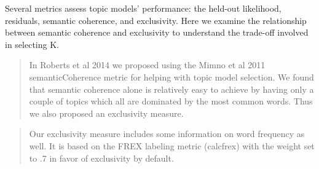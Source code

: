 \documentclass[
]{book}
\newenvironment{Shaded}{\begin{snugshade}}{\end{snugshade}}
\newcommand{\AttributeTok}[1]{\textcolor[rgb]{0.77,0.63,0.00}{#1}}
\newcommand{\DecValTok}[1]{\textcolor[rgb]{0.00,0.00,0.81}{#1}}
\newcommand{\FloatTok}[1]{\textcolor[rgb]{0.00,0.00,0.81}{#1}}
\newcommand{\FunctionTok}[1]{\textcolor[rgb]{0.00,0.00,0.00}{#1}}
\newcommand{\NormalTok}[1]{#1}
\newcommand{\SpecialCharTok}[1]{\textcolor[rgb]{0.00,0.00,0.00}{#1}}
\newcommand{\StringTok}[1]{\textcolor[rgb]{0.31,0.60,0.02}{#1}}
\begin{document}
Several metrics assess topic models' performance: the held-out likelihood, residuals, semantic coherence, and exclusivity. Here we examine the relationship between semantic coherence and exclusivity to understand the trade-off involved in selecting K.

\begin{quote}
In Roberts et al 2014 we proposed using the Mimno et al 2011 semanticCoherence metric for helping with topic model selection. We found that semantic coherence alone is relatively easy to achieve by having only a couple of topics which all are dominated by the most common words. Thus we also proposed an exclusivity measure.
\end{quote}

\begin{quote}
Our exclusivity measure includes some information on word frequency as well. It is based on the FREX labeling metric (calcfrex) with the weight set to .7 in favor of exclusivity by default.
\end{quote}

\begin{Shaded}
\end{Shaded}
\end{document}
